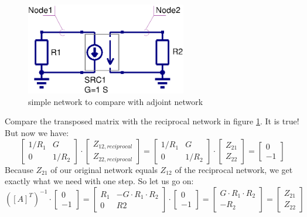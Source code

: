 \begin{figure}[ht]
\begin{center}
\includegraphics[width=7cm]{MNAnoise2}
\end{center}
\caption{simple network to compare with adjoint network}
\label{fig:mna_noise2}
\end{figure}
\FloatBarrier

Compare the transposed matrix with the reciprocal network
in figure \ref{fig:mna_noise2}. It is true! But now we
have:
\begin{equation}
\begin{bmatrix}
1/R_1 & G\\
  0   & 1/R_2
\end{bmatrix}
\cdot
\begin{bmatrix}
Z_{12,reciprocal}\\
Z_{22,reciprocal}
\end{bmatrix}
=
\begin{bmatrix}
1/R_1 & G\\
  0   & 1/R_2
\end{bmatrix}
\cdot
\begin{bmatrix}
Z_{21}\\
Z_{22}
\end{bmatrix}
=
\begin{bmatrix}
0\\
-1
\end{bmatrix}
\end{equation}
Because $Z_{21}$ of our original network equals $Z_{12}$ of
the reciprocal network, we get exactly what we need with one
step. So let us go on:
\begin{equation}
([A]^T)^{-1}\cdot
\begin{bmatrix}
  0\\
 -1
\end{bmatrix}
=
\begin{bmatrix}
R_1 & -G\cdot R_1\cdot R_2\\
  0 & R2
\end{bmatrix}
\cdot
\begin{bmatrix}
  0\\
 -1
\end{bmatrix}
=
\begin{bmatrix}
G\cdot R_1\cdot R_2\\
-R_2
\end{bmatrix}
=
\begin{bmatrix}
Z_{21}\\
Z_{22}
\end{bmatrix}
\end{equation}

